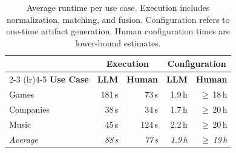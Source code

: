 
\begin{table}[t]
\caption{Average runtime per use case. Execution includes normalization, matching, and fusion. Configuration refers to one-time artifact generation. Human configuration times are lower-bound estimates.}
\label{tab:runtime}
\centering
\footnotesize
\begin{tabular}{@{}l rr rr@{}}
\toprule
 & \multicolumn{2}{c}{\textbf{Execution}} & \multicolumn{2}{c}{\textbf{Configuration}} \\
\cmidrule(lr){2-3} \cmidrule(lr){4-5}
\textbf{Use Case} & \textbf{LLM} & \textbf{Human} & \textbf{LLM} & \textbf{Human} \\
\midrule
Games     & 181\,s & 73\,s & 1.9\,h & $\geq$\,18\,h  \\
Companies & 38\,s  & 34\,s & 1.7\,h & $\geq$\,20\,h  \\
Music     & 45\,s  & 124\,s & 2.2\,h & $\geq$\,20\,h  \\
\midrule
\textit{Average} & \textit{88\,s} & \textit{77\,s} & \textit{1.9\,h} & $\geq$\,\textit{19\,h} \\
\bottomrule
\end{tabular}
\end{table}
